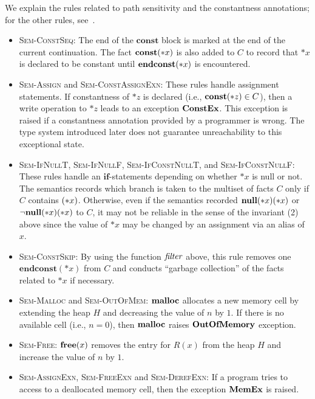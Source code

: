 We explain the rules related to path sensitivity and the
constantness annotations; for the other rules, see~\cite{}.
\begin{itemize}
\item \textsc{Sem-ConstSeq}: The end of the $\mathbf{const}$ block is
      marked at the end of the current continuation.  The fact
      $\mathbf{const}(*x)$ is also added to $C$ to record that $*x$ is declared
      to be constant until $\mathbf{endconst}(*x)$ is encountered.
\item \textsc{Sem-Assign} and \textsc{Sem-ConstAssignExn}: These rules
      handle assignment statements.  If constantness of $*z$ is declared
      (i.e., $\mathbf{const}(*z) \in C$), then a write operation to $*z$ leads
      to an exception $\mathbf{ConstEx}$.  This exception is raised if a
      constantness annotation provided by a programmer is wrong.  The
      type system introduced later does not guarantee unreachability to
      this exceptional state.
\item \textsc{Sem-IfNullT}, \textsc{Sem-IfNullF},
      \textsc{Sem-IfConstNullT}, and \textsc{Sem-IfConstNullF}: These
      rules handle an $\mathbf{if}$-statements depending on whether $*x$
      is null or not.  The semantics records which branch is taken to
      the multiset of facts $C$ only if $C$ contains $(*x)$.
      Otherwise, even if the semantics recorded $\mathbf{null}(*x)(*x)$ or
      $\neg\mathbf{null}(*x)(*x)$ to $C$, it may not be reliable in the sense of the
      invariant (2) above since the value of $*x$ may be changed by an
      assignment via an alias of $x$.
\item \textsc{Sem-ConstSkip}: By using the function $\mathit{filter}$ above,
      this rule removes one $\mathbf{endconst}(*x)$ from $C$ and
      conducts ``garbage collection'' of the facts related to $*x$ if
      necessary.
\item \textsc{Sem-Malloc} and \textsc{Sem-OutOfMem}: $\mathbf{malloc}$ allocates
      a new memory cell by extending the heap $H$ and decreasing the
      value of $n$ by $1$.  If there is no available cell (i.e., $n =
      0$), then $\mathbf{malloc}$ raises $\mathbf{OutOfMemory}$ exception.
\item \textsc{Sem-Free}: $\mathbf{free}(x)$ removes the entry for $R(x)$ from
      the heap $H$ and increase the value of $n$ by $1$.
\item \textsc{Sem-AssignExn}, \textsc{Sem-FreeExn} and
      \textsc{Sem-DerefExn}: If a program tries to access to a
      deallocated memory cell, then the exception $\mathbf{MemEx}$ is raised.
\end{itemize}


